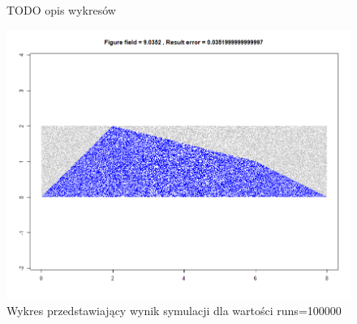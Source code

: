 \documentclass[a4paper,11pt,titlepage]{article}
\begin{document}
\begin{figure}[H]%
    \centering
    \qquad
    \caption{TODO opis wykresów}%
    \label{fig:figs}%
\end{figure}

\begin{figure}[H]
\centering
\includegraphics[width=1\columnwidth]{img/figure100k.PNG}
\caption{Wykres przedstawiający wynik symulacji dla wartości runs=100000}
\label{fig:figure100k}
\end{figure}
\end{document}
